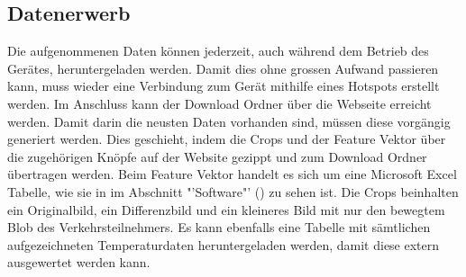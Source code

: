 \subsection{Datenerwerb}
Die aufgenommenen Daten können jederzeit, auch während dem Betrieb des Gerätes, heruntergeladen werden. Damit dies ohne grossen Aufwand passieren kann, muss wieder eine Verbindung zum Gerät mithilfe eines Hotspots erstellt werden. Im Anschluss kann der Download Ordner über die Webseite erreicht werden. Damit darin die neusten Daten vorhanden sind, müssen diese vorgängig generiert werden. Dies geschieht, indem die Crops und der Feature Vektor über die zugehörigen Knöpfe auf der Website gezippt und zum Download Ordner übertragen werden. Beim Feature Vektor handelt es sich um eine Microsoft Excel Tabelle, wie sie in im Abschnitt "'Software"' () zu sehen ist. Die Crops beinhalten ein Originalbild, ein Differenzbild und ein kleineres Bild mit nur den bewegtem Blob des Verkehrsteilnehmers. Es kann ebenfalls eine Tabelle mit sämtlichen aufgezeichneten Temperaturdaten heruntergeladen werden, damit diese extern ausgewertet werden kann.